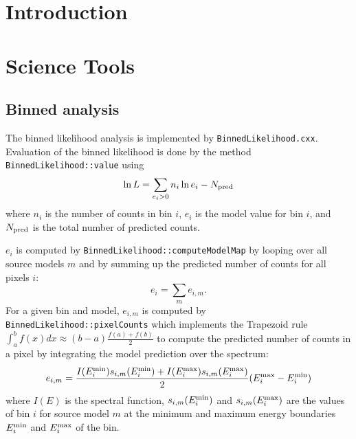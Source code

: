 \documentclass{article}[12pt,a4]
\begin{document}
\frontpage


\section{Introduction}



\section{Science Tools}

\subsection{Binned analysis}

The binned likelihood analysis is implemented by {\tt BinnedLikelihood.cxx}.
Evaluation of the binned likelihood is done by the method
{\tt BinnedLikelihood::value}
using
\begin{equation}
\ln L = \sum_{e_i > 0} n_i \ln e_i - N_{\rm pred}
\end{equation}
where
$n_i$ is the number of counts in bin $i$,
$e_i$ is the model value for bin $i$,
and
$N_{\rm pred}$ is the total number of predicted counts.

$e_i$ is computed by
{\tt BinnedLikelihood::computeModelMap}
by looping over all source models $m$ and by summing up the predicted number of
counts for all pixels $i$:
\begin{equation}
e_i = \sum_m e_{i,m} .
\end{equation}
For a given bin and model, $e_{i,m}$ is computed by 
{\tt BinnedLikelihood::pixelCounts} which implements the Trapezoid rule
$\int_a^b f(x) dx \approx (b-a) \frac{f(a) + f(b)}{2}$
to compute the predicted number of counts in a pixel by integrating the
model prediction over the spectrum:
\begin{equation}
e_{i,m} = \frac{
I(E_i^{\rm min}) s_{i,m}(E_i^{\rm min}) + I(E_i^{\rm max}) s_{i,m}(E_i^{\rm max})}{2} 
( E_i^{\rm max} - E_i^{\rm min} )
\end{equation}
where
$I(E)$ is the spectral function,
$s_{i,m}(E_i^{\rm min})$ and $s_{i,m}(E_i^{\rm max})$ are the values of bin $i$ for
source model $m$ at the minimum and maximum energy boundaries 
$E_i^{\rm min}$ and $E_i^{\rm max}$ of the bin.
\end{document}
